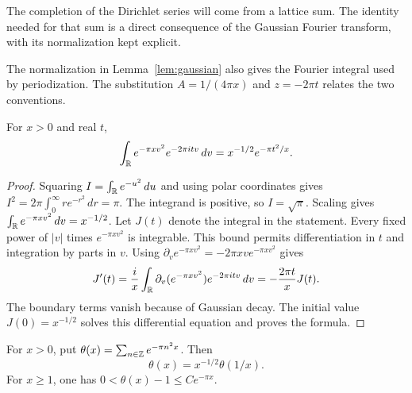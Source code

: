 The completion of the Dirichlet series will come from a lattice sum.
The identity needed for that sum is a direct consequence of the Gaussian
Fourier transform, with its normalization kept explicit.

The normalization in Lemma~\ref{lem:gaussian} also gives the Fourier
integral used by periodization.  The substitution
$A=1/(4\pi x)$ and $z=-2\pi t$ relates the two conventions.

\begin{lemma}
\label{lem:gaussian-real-transform}
For $x>0$ and real $t$,
\[
 \int_{\mathbb R}e^{-\pi xv^2}e^{-2\pi itv}\,dv
       =x^{-1/2}e^{-\pi t^2/x}.
\]
\end{lemma}
\begin{proof}
Squaring $I=\int_{\mathbb R}e^{-u^2}\,du$ and using polar coordinates gives
$I^2=2\pi\int_0^\infty re^{-r^2}\,dr=\pi$.
The integrand is positive, so $I=\sqrt\pi$.
Scaling gives $\int_{\mathbb R}e^{-\pi xv^2}\,dv=x^{-1/2}$.
Let $J(t)$ denote the integral in the statement.
Every fixed power of $|v|$ times $e^{-\pi xv^2}$ is integrable.
This bound permits differentiation in $t$ and integration by parts in $v$.
Using $\partial_v e^{-\pi xv^2}=-2\pi xv e^{-\pi xv^2}$ gives
\[
 J'(t)=\frac{i}{x}\int_{\mathbb R}
       \partial_v(e^{-\pi xv^2})e^{-2\pi itv}\,dv
       =-\frac{2\pi t}{x}J(t).
\]
The boundary terms vanish because of Gaussian decay.
The initial value $J(0)=x^{-1/2}$ solves this differential equation
and proves the formula.
\end{proof}

\begin{lemma}
\label{lem:theta}
For $x>0$, put $\theta(x)=\sum_{n\in\mathbb Z}e^{-\pi n^2x}$.
Then
\begin{equation}
 \theta(x)=x^{-1/2}\theta(1/x).
 \label{eq:theta-reflection}
\end{equation}
For $x\geq1$, one has $0<\theta(x)-1\leq C e^{-\pi x}$.
\end{lemma}

